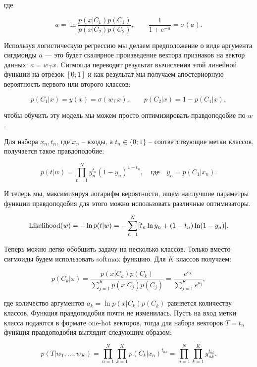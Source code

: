 где

\begin{equation}
 a = \ln\frac{p(x|C_1)p(C_1)}{p(x|C_2)p(C_2)},\qquad \frac{1}{1+e^{-a}} = \sigma (a).
\end{equation}

Используя логистическую регрессию мы делаем предположение о виде аргумента сигдмоиды $a$ --- это будет
скалярное произведение вектора признаков на вектор данных: $a = w_\top x$. Cигмоида переводит результат
вычисления этой линейной функции на отрезок $[0;1]$ и как результат мы получаем апостериорную вероятность
первого или второго классов:

\begin{equation}
 p(C_1|x) = y(x) = \sigma (w_\top x),\qquad p(C_2|x) = 1-p(C_1|x),
\end{equation}

чтобы обучить эту модель мы можем просто оптимизировать правдоподобие по $w$.

Для набора ${x_n, t_n}$, где $x_n$ -- входы, а $t_n \in \{0;1\}$ -- соответствующие метки классов, получается
такое правдоподобие:

\begin{equation}
 p(t|w) = \prod_{n=1}^N y_n^{t_n}(1-y_n)^{1-t_n},\quad\text{где}\quad y_n = p(C_1|x_n).
\end{equation}

И теперь мы, максимизируя логарифм вероятности, ищем наилучшие параметры функции правдоподобия для этого можно
использовать различные оптимизаторы.

\begin{equation}
 \operatorname*{Likelihood} (w) = -\ln p(t|w) = -\sum_{n=1}^N[t_n \ln y_n + (1-t_n) \ln (1-y_n)].
\end{equation}

Теперь можно легко обобщить задачу на несколько классов. Только вместо сигмоиды будем использовать softmax
функцию. Для $K$ классов получаем:

\begin{equation}
 p(C_k|x) = \frac{p(x|C_k)p(C_k)}{\sum_{j=1}^K p(x|C_j)p(C_j)} = \frac{e^{a_k}}{\sum_{j=1}^K e^{a_j}},
\end{equation}

где количество аргументов $a_k = \ln p(x|C_k)p(C_k)$ равняется количеству классов. Функция правдоподобия почти
не изменилась. Пусть на вход метки класса подаются в формате one-hot векторов, тогда для набора векторов $T =
{t_n}$ функция правдоподобия выглядит следующим образом:

\begin{equation}
 p(T|w_1,\ldots,w_K) = \prod_{n=1}^N \prod_{k=1}^K p(C_k|x_n)^{t_{nk}} = \prod_{n=1}^N \prod_{k=1}^K
y_{nk}^{t_{nk}}.
\end{equation}

